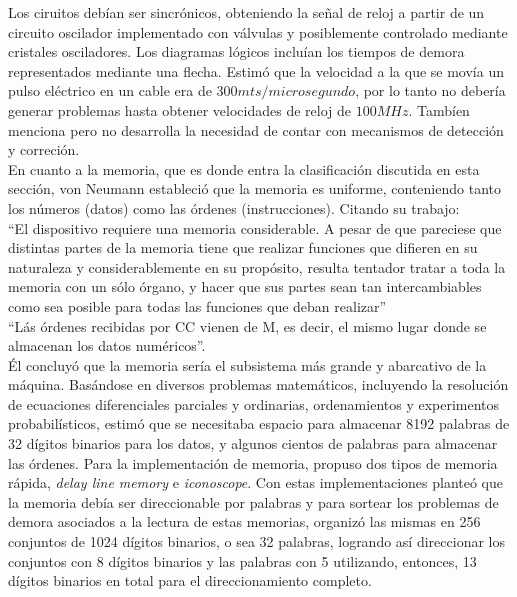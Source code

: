 Los ciruitos debían ser sincrónicos, obteniendo la señal de reloj a partir de un circuito oscilador implementado con válvulas y posiblemente controlado mediante cristales osciladores. Los diagramas lógicos incluían los tiempos de demora representados mediante una flecha. Estimó que la velocidad a la que se movía un pulso eléctrico en un cable era de $300 mts/microsegundo$, por lo tanto no debería generar problemas hasta obtener velocidades de reloj de $100MHz$. Tambíen menciona pero no desarrolla la necesidad de contar con mecanismos de detección y correción.\\
En cuanto a la memoria, que es donde entra la clasificación discutida en esta sección, von Neumann estableció que la memoria es uniforme, conteniendo tanto los números (datos) como las órdenes (instrucciones). Citando su trabajo:\\
``El dispositivo requiere una memoria considerable. A pesar de que pareciese que distintas partes de la memoria tiene que realizar funciones que difieren en su naturaleza y considerablemente en su propósito, resulta tentador tratar a toda la memoria con un sólo órgano, y hacer que sus partes sean tan intercambiables como sea posible para todas las funciones que deban realizar'' \cite[sección, 2.5]{vonNeumann}\\
``Lás órdenes recibidas por CC vienen de M, es decir, el mismo lugar donde se almacenan los datos numéricos''\cite[sección, 14.0]{vonNeumann}.\\
Él concluyó que la memoria sería el subsistema más grande y abarcativo de la máquina. Basándose en diversos problemas matemáticos, incluyendo la resolución de ecuaciones diferenciales parciales y ordinarias, ordenamientos y experimentos probabilísticos, estimó que se necesitaba espacio para almacenar 8192 palabras de 32 dígitos binarios para los datos, y algunos cientos de palabras para  almacenar las órdenes. Para la implementación de memoria, propuso dos tipos de memoria rápida, \emph{delay line memory} e \emph{iconoscope}. Con estas implementaciones planteó que la memoria debía ser direccionable por palabras y para sortear los problemas de demora asociados a la lectura de estas memorias, organizó las mismas en 256 conjuntos de 1024 dígitos binarios, o sea 32 palabras, logrando así direccionar los conjuntos con 8 dígitos binarios y las palabras con 5 utilizando, entonces, 13 dígitos binarios en total para el direccionamiento completo.\\
